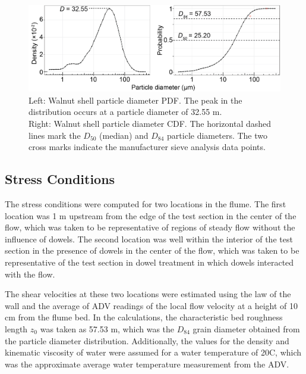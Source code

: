 \documentclass[12pt]{article}
\begin{document}
\begin{figure}[H]
    \centering
    \includegraphics[width=6.5in]{size_distn.png}
    \caption{Left: Walnut shell particle diameter PDF. The peak in the distribution occurs at a particle diameter of 32.55 \textmu m. \\
    Right: Walnut shell particle diameter CDF. The horizontal dashed lines mark the $D_{50}$ (median) and $D_{84}$ particle diameters. The two cross marks indicate the manufacturer sieve analysis data points.}
    \label{fig_sizedistn}
\end{figure}

\subsection{Stress Conditions}

The stress conditions were computed for two locations in the flume. The first location was 1 m upstream from the edge of the test section in the center of the flow, which was taken to be representative of regions of steady flow without the influence of dowels. The second location was well within the interior of the test section in the presence of dowels in the center of the flow, which was taken to be representative of the test section in dowel treatment in which dowels interacted with the flow.

The shear velocities at these two locations were estimated using the law of the wall and the average of ADV readings of the local flow velocity at a height of 10 cm from the flume bed. In the calculations, the characteristic bed roughness length $z_0$ was taken as 57.53 \textmu m, which was the $D_{84}$ grain diameter obtained from the particle diameter distribution. Additionally, the values for the density and kinematic viscosity of water were assumed for a water temperature of 20\textdegree C, which was the approximate average water temperature measurement from the ADV.
\end{document}
